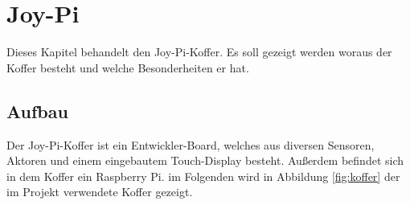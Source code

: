 \chapter{Joy-Pi}
Dieses Kapitel behandelt den Joy-Pi-Koffer. Es soll gezeigt werden woraus der Koffer besteht und welche Besonderheiten er hat.

\section{Aufbau}
Der Joy-Pi-Koffer ist ein Entwickler-Board, welches aus diversen Sensoren, Aktoren und einem eingebautem Touch-Display besteht. Außerdem befindet sich in dem Koffer ein Raspberry Pi. im Folgenden wird in Abbildung \ref{fig:koffer} der im Projekt verwendete Koffer gezeigt.
\begin{figure}[H] %
\end{figure} %
